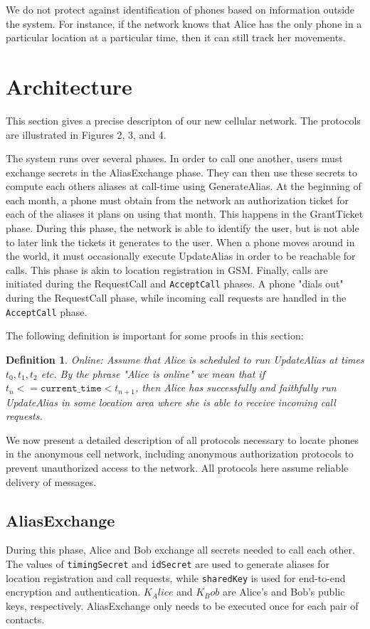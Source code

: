 \documentclass[11pt]{article}
\newtheorem{mydef}{Definition}
\begin{document}
We do not protect against identification of phones based on information outside the system. For instance, if the network knows that Alice has the only phone in a particular location at a particular time, then it can still track her movements.

\section{Architecture}

This section gives a precise descripton of our new cellular network. The protocols are illustrated in Figures 2, 3, and 4.

The system runs over several phases. In order to call one another, users must exchange secrets in the AliasExchange phase. They can then use these secrets to compute each others aliases at call-time using GenerateAlias. At the beginning of each month, a phone must obtain from the network an authorization ticket for each of the aliases it plans on using that month. This happens in the GrantTicket phase. During this phase, the network is able to identify the user, but is not able to later link the tickets it generates to the user. When a phone moves around in the world, it must occasionally execute UpdateAlias in order to be reachable for calls. This phase is akin to location registration in GSM. Finally, calls are initiated during the RequestCall and \texttt{AcceptCall} phases. A phone "dials out" during the RequestCall phase, while incoming call requests are handled in the \texttt{AcceptCall} phase.

The following definition is important for some proofs in this section:
\begin{mydef} Online: Assume that Alice is scheduled to run \emph{UpdateAlias} at times $t_0, t_1, t_2$ etc. By the phrase \emph{"Alice is online"} we mean that if $t_n <= \texttt{current_time} < t_{n+1}$, then Alice has successfully and faithfully run \emph{UpdateAlias} in some location area where she is able to receive incoming call requests.
\end{mydef}

We now present a detailed description of all protocols necessary to locate phones in the anonymous cell network, including anonymous authorization protocols to prevent unauthorized access to the network. All protocols here assume reliable delivery of messages.

\subsection{AliasExchange}
During this phase, Alice and Bob exchange all secrets needed to call each other. The values of \texttt{timingSecret} and \texttt{idSecret} are used to generate aliases for location registration and call requests, while \texttt{sharedKey} is used for end-to-end encryption and authentication. \texttt{$K_Alice$} and \texttt{$K_Bob$} are Alice's and Bob's public keys, respectively. AliasExchange only needs to be executed once for each pair of contacts.
\end{document}

